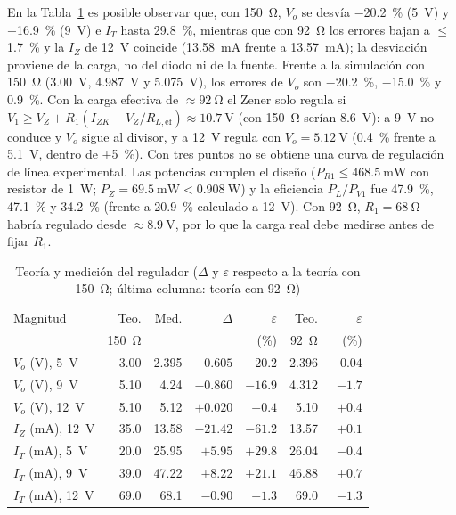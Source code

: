 \documentclass[9pt, conference]{IEEEtran}
\newcommand{\qV}[1]{\SI{#1}{\volt}}
\newcommand{\qmA}[1]{\SI{#1}{\milli\ampere}}
\newcommand{\qohm}[1]{\SI{#1}{\ohm}}
\newcommand{\qmW}[1]{\SI{#1}{\milli\watt}}
\newcommand{\qW}[1]{\SI{#1}{\watt}}
\newcommand{\pct}[1]{\SI{#1}{\percent}}
\begin{document}
En la Tabla~\ref{tab:exp_z3} es posible observar que, con \qohm{150}, $V_o$ se desvía \pct{-20.2} (\qV{5}) y \pct{-16.9} (\qV{9}) e $I_T$ hasta \pct{+29.8}, mientras que con \qohm{92} los errores bajan a $\le$\pct{1.7} y la $I_Z$ de \qV{12} coincide (\qmA{13.58} frente a \qmA{13.57}); la desviación proviene de la carga, no del diodo ni de la fuente. Frente a la simulación con \qohm{150} (\qV{3.00}, \qV{4.987} y \qV{5.075}), los errores de $V_o$ son \pct{-20.2}, \pct{-15.0} y \pct{+0.9}. Con la carga efectiva de $\approx\qohm{92}$ el Zener solo regula si $V_1\ge V_Z+R_1(I_{ZK}+V_Z/R_{L,\mathrm{ef}})\approx\qV{10.7}$ (con \qohm{150} serían \qV{8.6}): a \qV{9} no conduce y $V_o$ sigue al divisor, y a \qV{12} regula con $V_o=\qV{5.12}$ (\pct{+0.4} frente a \qV{5.1}, dentro de $\pm$\pct{5}). Con tres puntos no se obtiene una curva de regulación de línea experimental. Las potencias cumplen el diseño ($P_{R1}\le\qmW{468.5}$ con resistor de \qW{1}; $P_Z=\qmW{69.5}<\qW{0.908}$) y la eficiencia $P_L/P_{V1}$ fue \pct{47.9}, \pct{47.1} y \pct{34.2} (frente a \pct{20.9} calculado a \qV{12}). Con \qohm{92}, $R_1=\qohm{68}$ habría regulado desde $\approx\qV{8.9}$, por lo que la carga real debe medirse antes de fijar $R_1$.

\begin{table}[htbp]
\caption{Teoría y medición del regulador ($\Delta$ y $\varepsilon$ respecto a la teoría con \qohm{150}; última columna: teoría con \qohm{92})}
\label{tab:exp_z3}
\centering
\scriptsize
\setlength{\tabcolsep}{2.5pt}
\begin{tabular}{lrrrrrr}
\toprule
Magnitud & Teo. & Med. & $\Delta$ & $\varepsilon$ & Teo. & $\varepsilon$ \\
 & \qohm{150} & & & (\%) & \qohm{92} & (\%) \\
\midrule
$V_o$ (V), \qV{5}  & 3.00 & 2.395 & $-0.605$ & $-20.2$ & 2.396 & $-0.04$ \\
$V_o$ (V), \qV{9}  & 5.10 & 4.24 & $-0.860$ & $-16.9$ & 4.312 & $-1.7$ \\
$V_o$ (V), \qV{12} & 5.10 & 5.12 & $+0.020$ & $+0.4$ & 5.10 & $+0.4$ \\
$I_Z$ (mA), \qV{12} & 35.0 & 13.58 & $-21.42$ & $-61.2$ & 13.57 & $+0.1$ \\
$I_T$ (mA), \qV{5}  & 20.0 & 25.95 & $+5.95$ & $+29.8$ & 26.04 & $-0.4$ \\
$I_T$ (mA), \qV{9}  & 39.0 & 47.22 & $+8.22$ & $+21.1$ & 46.88 & $+0.7$ \\
$I_T$ (mA), \qV{12} & 69.0 & 68.1 & $-0.90$ & $-1.3$ & 69.0 & $-1.3$ \\
\bottomrule
\end{tabular}
\end{table}
\end{document}
